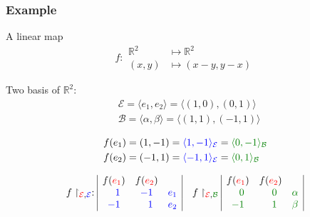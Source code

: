 \documentclass{beamer}
\begin{document}
\begin{frame}
  \frametitle{Example}
  \begin{exampleblock}{A linear map}
    \[f: \begin{aligned} \mathbb{R}^2 &\mapsto \mathbb{R}^2\\ (x,y) &\mapsto (x - y, y - x) \end{aligned}\]

    Two basis of $\mathbb{R}^2 :$
    \[\begin{aligned}
    &\mathcal{E} = \langle e_1, e_2 \rangle = \langle (1,0), (0,1) \rangle \\ 
    &\mathcal{B} = \langle \alpha, \beta \rangle = \langle (1,1), (-1, 1) \rangle\\
    \end{aligned}
    \]
    \[
    \begin{aligned}
      &f(e_1) = (1,-1) = {\color{blue} \langle 1, -1 \rangle_{\mathcal{E}}} = {\color{darkgreen} \langle 0, -1\rangle_{\mathcal{B}}}\\
      &f(e_2) = (-1, 1) = {\color{blue} \langle -1, 1 \rangle_{\mathcal{E}}} = {\color{darkgreen} \langle 0, 1 \rangle_{\mathcal{B}}} \\      
    \end{aligned}
    \]


    \[f\restriction_{{\color{red}\mathcal{E}}, {\color{blue}\mathcal{E}}}:
    \begin{array}{|ccc|}
      f({\color{red}e_1}) & f({\color{red}e_2}) & \\
      \color{blue}\phantom{-}1 & \color{blue} -1 & \color{blue} e_1\\
      \color{blue}-1 & \color{blue} \phantom{-}1 & \color{blue} e_2
    \end{array}
    \quad
    f\restriction_{{\color{red}\mathcal{E}}, {\color{darkgreen} \mathcal{B}}}
    \begin{array}{|ccc|}
      f({\color{red}e_1}) & f({\color{red}e_2}) & \\
      \color{darkgreen}\phantom{-}0 & \color{darkgreen} \phantom{-}0 & \color{darkgreen} \alpha\\
      \color{darkgreen} -1 & \color{darkgreen}\phantom{-}1 & \color{darkgreen} \beta
    \end{array}
    \]

    
  \end{exampleblock}
\end{frame}
\end{document}
